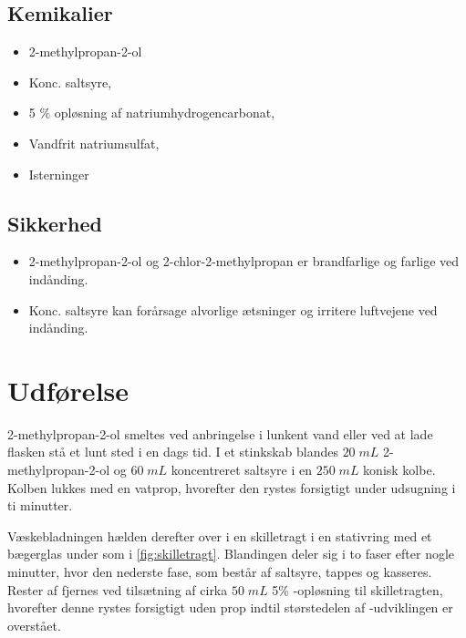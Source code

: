 \documentclass{report}
\begin{document}
\subsection*{Kemikalier}
\begin{itemize}
  \item 2-methylpropan-2-ol
  \item Konc. saltsyre, 
  \item 5 \% opløsning af natriumhydrogencarbonat,  
\item Vandfrit natriumsulfat,  
\item Isterninger
\end{itemize}
\subsection*{Sikkerhed}
\begin{itemize}
  \item 2-methylpropan-2-ol og 2-chlor-2-methylpropan er brandfarlige og farlige ved indånding.
  \item Konc. saltsyre kan forårsage alvorlige ætsninger og irritere luftvejene ved indånding.
\end{itemize}

\section*{Udførelse}
2-methylpropan-2-ol smeltes ved anbringelse i lunkent vand eller ved at lade flasken stå et lunt sted i en dags tid.
I et stinkskab blandes $20 \;\unit{mL} $ 2-methylpropan-2-ol og $60 \;\unit{mL} $ koncentreret saltsyre i en $250 \;\unit{mL} $ konisk kolbe.
Kolben lukkes med en vatprop, hvorefter den rystes forsigtigt under udsugning i ti minutter.

Væskebladningen hælden derefter over i en skilletragt i en stativring med et bægerglas under som i \cref{fig:skilletragt}.
Blandingen deler sig i to faser efter nogle minutter, hvor den nederste fase, som består af saltsyre, tappes og kasseres.
Rester af  fjernes ved tilsætning af cirka $50 \;\unit{mL} $ 5\% -opløsning til skilletragten, hvorefter denne rystes forsigtigt uden prop indtil størstedelen af -udviklingen er overstået. 
\end{document}
